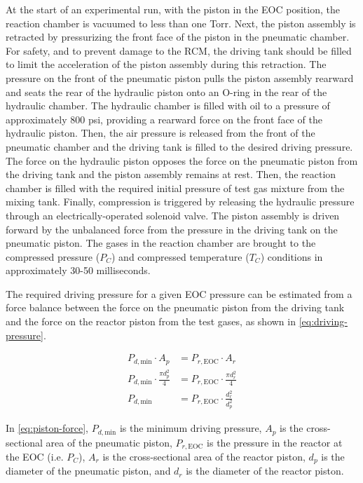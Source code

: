 \documentclass[12pt, letterpaper]{article}
\begin{document}
At the start of an experimental run, with the piston in the
EOC position, the reaction chamber is vacuumed to less
than one Torr. Next, the piston assembly is retracted by pressurizing
the front face of the piston in the pneumatic chamber.
For safety, and to prevent damage to the RCM, the driving tank should
be filled to limit the acceleration of the piston assembly during this
retraction.
The pressure on the front of the pneumatic piston pulls the
piston assembly rearward and seats the rear of the
hydraulic piston onto an O-ring in the rear of the
hydraulic chamber. The hydraulic chamber is filled with oil to
a pressure of approximately 800 psi, providing a rearward force on the
front face of the hydraulic piston. Then, the air pressure is released from
the front of the pneumatic chamber and the driving tank is filled to
the desired driving pressure. The
force on the hydraulic piston opposes the force on the pneumatic piston
from the driving tank and the piston assembly remains at rest. Then, the
reaction chamber is filled with the required initial pressure of test
gas mixture from the mixing tank. Finally, compression is triggered by
releasing the hydraulic pressure through an electrically-operated solenoid
valve. The piston assembly is driven forward by the unbalanced force from
the pressure in the driving tank on the pneumatic piston. The gases
in the reaction chamber are brought to the compressed pressure ($P_C$) and
compressed temperature ($T_C$) conditions in approximately 30-50
milliseconds.

The required driving pressure for a given EOC pressure can be estimated
from a force balance between the force on the pneumatic piston from the
driving tank and the force on the reactor piston from the test gases,
as shown in \autoref{eq:driving-pressure}.

\begin{subequations}
\label{eq:piston-force}
\begin{align}
    P_{d,\text{min}} \cdot A_p &= P_{r,\text{EOC}} \cdot A_r \\
    P_{d,\text{min}} \cdot \frac{\pi d_p^2}{4} &= P_{r,\text{EOC}} \cdot \frac{\pi d_r^2}{4} \\
    P_{d,\text{min}} &= P_{r,\text{EOC}} \cdot \frac{d_r^2}{d_p^2} \label{eq:driving-pressure}
\end{align}
\end{subequations}

In \autoref{eq:piston-force}, $P_{d,\text{min}}$ is the minimum
driving pressure, $A_p$ is the cross-sectional area of the pneumatic piston,
$P_{r,\text{EOC}}$ is the pressure in the reactor at the EOC (i.e. $P_C$),
$A_r$ is the cross-sectional area of the reactor piston, $d_p$ is the diameter
of the pneumatic piston, and $d_r$ is the diameter of the reactor piston.
\end{document}

